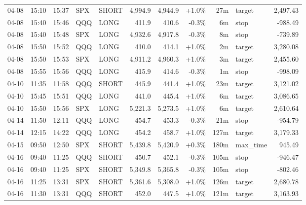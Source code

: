 \documentclass[11pt,a4paper,twoside]{article}
\begin{document}
\begin{center}
\begin{longtable}{>{\color{txtmain}}l l l l l r r r r >{\color{txtmain}}l r}
04-08 & 15:10 & 15:37 & SPX & SHORT & 4,994.9 & 4,944.9 & \textcolor{wingreen}{+1.0\%} & 27m & target & \textcolor{wingreen}{2,497.43} \\
04-08 & 15:40 & 15:46 & QQQ & LONG & 411.9 & 410.6 & \textcolor{lossred}{-0.3\%} & 6m & stop & \textcolor{lossred}{-988.49} \\
04-08 & 15:40 & 15:48 & SPX & LONG & 4,932.6 & 4,917.8 & \textcolor{lossred}{-0.3\%} & 8m & stop & \textcolor{lossred}{-739.89} \\
04-08 & 15:50 & 15:52 & QQQ & LONG & 410.0 & 414.1 & \textcolor{wingreen}{+1.0\%} & 2m & target & \textcolor{wingreen}{3,280.08} \\
04-08 & 15:50 & 15:53 & SPX & LONG & 4,911.2 & 4,960.3 & \textcolor{wingreen}{+1.0\%} & 3m & target & \textcolor{wingreen}{2,455.60} \\
04-08 & 15:55 & 15:56 & QQQ & LONG & 415.9 & 414.6 & \textcolor{lossred}{-0.3\%} & 1m & stop & \textcolor{lossred}{-998.09} \\
04-10 & 11:35 & 11:58 & QQQ & SHORT & 445.9 & 441.4 & \textcolor{wingreen}{+1.0\%} & 23m & target & \textcolor{wingreen}{3,121.02} \\
04-10 & 15:45 & 15:51 & QQQ & LONG & 441.0 & 445.4 & \textcolor{wingreen}{+1.0\%} & 6m & target & \textcolor{wingreen}{3,086.65} \\
04-10 & 15:50 & 15:56 & SPX & LONG & 5,221.3 & 5,273.5 & \textcolor{wingreen}{+1.0\%} & 6m & target & \textcolor{wingreen}{2,610.64} \\
04-14 & 11:50 & 12:11 & QQQ & LONG & 454.7 & 453.3 & \textcolor{lossred}{-0.3\%} & 21m & stop & \textcolor{lossred}{-954.79} \\
04-14 & 12:15 & 14:22 & QQQ & LONG & 454.2 & 458.7 & \textcolor{wingreen}{+1.0\%} & 127m & target & \textcolor{wingreen}{3,179.33} \\
04-15 & 09:50 & 12:50 & SPX & SHORT & 5,439.8 & 5,420.9 & \textcolor{wingreen}{+0.3\%} & 180m & max\_time & \textcolor{wingreen}{945.49} \\
04-16 & 09:40 & 11:25 & QQQ & SHORT & 450.7 & 452.1 & \textcolor{lossred}{-0.3\%} & 105m & stop & \textcolor{lossred}{-946.47} \\
04-16 & 09:40 & 11:25 & SPX & SHORT & 5,349.8 & 5,365.8 & \textcolor{lossred}{-0.3\%} & 105m & stop & \textcolor{lossred}{-802.46} \\
04-16 & 11:25 & 13:31 & SPX & SHORT & 5,361.6 & 5,308.0 & \textcolor{wingreen}{+1.0\%} & 126m & target & \textcolor{wingreen}{2,680.78} \\
04-16 & 11:30 & 13:31 & QQQ & SHORT & 452.0 & 447.5 & \textcolor{wingreen}{+1.0\%} & 121m & target & \textcolor{wingreen}{3,163.93} \\

\end{longtable}
\end{center}
\end{document}
